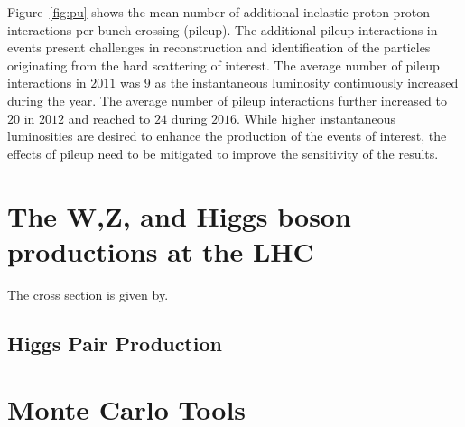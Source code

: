 Figure~\ref{fig:pu} shows the mean number of additional inelastic proton-proton interactions per bunch crossing (pileup). The additional pileup interactions in events present challenges in reconstruction and identification of the particles originating from the hard scattering of interest. The average number of pileup interactions in $2011$ was $9$ as the instantaneous luminosity continuously increased during the year. The average number of pileup interactions further increased to $20$ in $2012$ and reached to $24$ during $2016$.  While higher instantaneous luminosities are desired to enhance the production of the events of interest, the effects of pileup need to be mitigated to improve the sensitivity of the results. 

\section{The W,Z, and Higgs boson productions at the LHC}

The cross section is given by.

\subsection{Higgs Pair Production}

\section{Monte Carlo Tools}